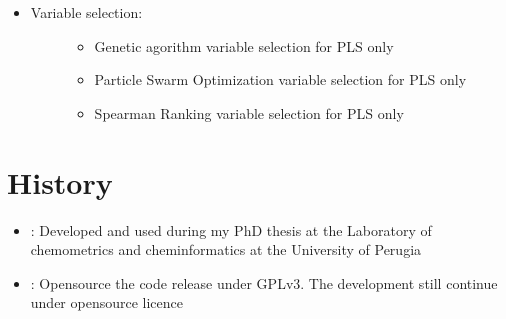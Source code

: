 \documentclass[letterpaper,10pt,english]{sphinxmanual}
\begin{document}
\begin{itemize}
\begin{description}
\begin{itemize}
\item {} 
\sphinxAtStartPar
Repeated K\sphinxhyphen{}Fold cross validation

\item {} 
\sphinxAtStartPar
Train/Test split

\end{itemize}

\end{description}

\item {} \begin{description}
\item[{Variable selection:}] \leavevmode\begin{itemize}
\item {} 
\sphinxAtStartPar
Genetic agorithm variable selection for PLS only

\item {} 
\sphinxAtStartPar
Particle Swarm Optimization variable selection for PLS only

\item {} 
\sphinxAtStartPar
Spearman Ranking variable selection for PLS only

\end{itemize}

\end{description}

\end{itemize}


\section{History}
\label{\detokenize{Overview:history}}\begin{itemize}
\item {} 
: Developed and used during my PhD thesis at the Laboratory of chemometrics and cheminformatics at the University of Perugia

\item {} 
: Open\sphinxhyphen{}source the code release under GPLv3. The development still continue under open\sphinxhyphen{}source licence

\end{itemize}
\end{document}

